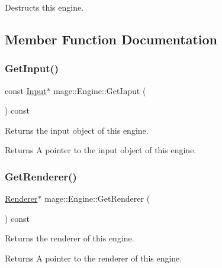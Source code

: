 Destructs this engine. 

\subsection{Member Function Documentation}
\hypertarget{classmage_1_1_engine_a5f21f58416ff6a8afea615d55c8c6c54}{}\label{classmage_1_1_engine_a5f21f58416ff6a8afea615d55c8c6c54} 
\subsubsection{\texorpdfstring{Get\+Input()}{GetInput()}}
{\footnotesize\ttfamily const \hyperlink{classmage_1_1_input}{Input}$\ast$ mage\+::\+Engine\+::\+Get\+Input (\begin{DoxyParamCaption}{ }\end{DoxyParamCaption}) const}

Returns the input object of this engine.

\begin{DoxyReturn}{Returns}
A pointer to the input object of this engine. 
\end{DoxyReturn}
\hypertarget{classmage_1_1_engine_a45a5005c7072937cb54a3f2f6431c66c}{}\label{classmage_1_1_engine_a45a5005c7072937cb54a3f2f6431c66c} 
\subsubsection{\texorpdfstring{Get\+Renderer()}{GetRenderer()}}
{\footnotesize\ttfamily \hyperlink{classmage_1_1_renderer}{Renderer}$\ast$ mage\+::\+Engine\+::\+Get\+Renderer (\begin{DoxyParamCaption}{ }\end{DoxyParamCaption}) const}

Returns the renderer of this engine.

\begin{DoxyReturn}{Returns}
A pointer to the renderer of this engine. 
\end{DoxyReturn}
\hypertarget{classmage_1_1_engine_af55c457336dcbc0e940578425c74d868}{}\label{classmage_1_1_engine_af55c457336dcbc0e940578425c74d868} 
